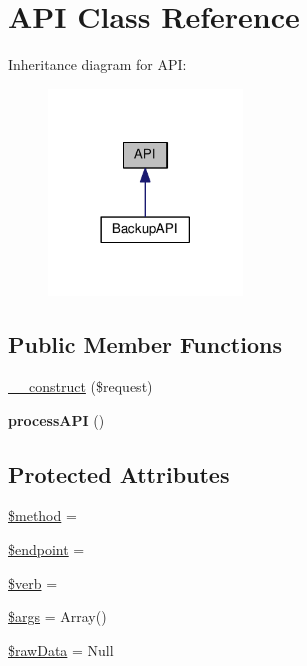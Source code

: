 \hypertarget{class_a_p_i}{}\section{A\+PI Class Reference}
\label{class_a_p_i}


Inheritance diagram for A\+PI\+:
\nopagebreak
\begin{figure}[H]
\begin{center}
\leavevmode
\includegraphics[width=146pt]{class_a_p_i__inherit__graph}
\end{center}
\end{figure}
\subsection*{Public Member Functions}
\begin{DoxyCompactItemize}
\item 
\hyperlink{class_a_p_i_af3ed2fc104249141ea1cca845bb80a5a}{\+\_\+\+\_\+construct} (\$request)
\item 
\mbox{\label{class_a_p_i_a6469a4c34293f8aa7a4cf280147a4ab7}} 
{\bfseries process\+A\+PI} ()
\end{DoxyCompactItemize}
\subsection*{Protected Attributes}
\begin{DoxyCompactItemize}
\item 
\hyperlink{class_a_p_i_a5a9859ba17e15528c82f038a47eb3132}{\$method} = \textquotesingle{}\textquotesingle{}
\item 
\hyperlink{class_a_p_i_adabfc465b969f5dd4ec2c5f073e142ae}{\$endpoint} = \textquotesingle{}\textquotesingle{}
\item 
\hyperlink{class_a_p_i_a6a8f3d5321c4e9c7f3a9a29f0635b138}{\$verb} = \textquotesingle{}\textquotesingle{}
\item 
\hyperlink{class_a_p_i_a062ccad22e51e139ebf34d55abdb735d}{\$args} = Array()
\item 
\hyperlink{class_a_p_i_a045d1db08467e166b58c5af7447e02b4}{\$raw\+Data} = Null
\end{DoxyCompactItemize}


